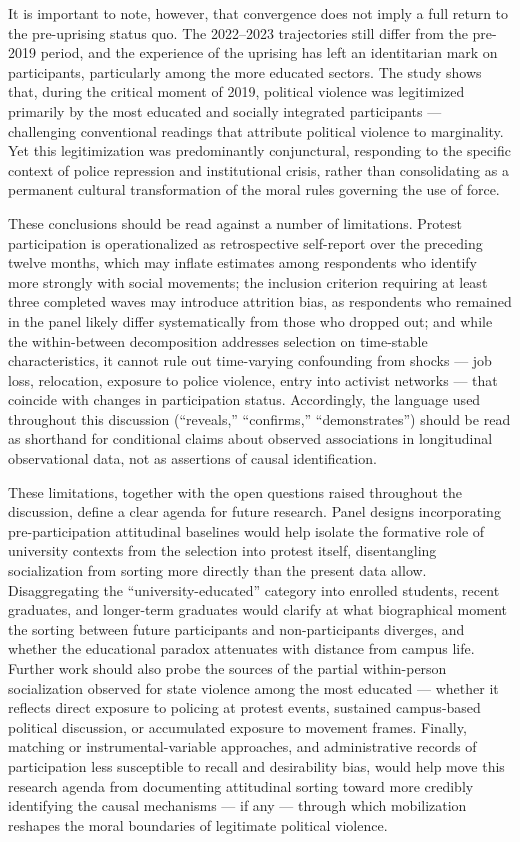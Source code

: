 \documentclass[
  13pt,
]{article}
\begin{document}
It is important to note, however, that convergence does not imply a full
return to the pre-uprising status quo. The 2022--2023 trajectories still
differ from the pre-2019 period, and the experience of the uprising has
left an identitarian mark on participants, particularly among the more
educated sectors. The study shows that, during the critical moment of
2019, political violence was legitimized primarily by the most educated
and socially integrated participants --- challenging conventional
readings that attribute political violence to marginality. Yet this
legitimization was predominantly conjunctural, responding to the
specific context of police repression and institutional crisis, rather
than consolidating as a permanent cultural transformation of the moral
rules governing the use of force.

These conclusions should be read against a number of limitations.
Protest participation is operationalized as retrospective self-report
over the preceding twelve months, which may inflate estimates among
respondents who identify more strongly with social movements; the
inclusion criterion requiring at least three completed waves may
introduce attrition bias, as respondents who remained in the panel
likely differ systematically from those who dropped out; and while the
within-between decomposition addresses selection on time-stable
characteristics, it cannot rule out time-varying confounding from shocks
--- job loss, relocation, exposure to police violence, entry into
activist networks --- that coincide with changes in participation
status. Accordingly, the language used throughout this discussion
(``reveals,'' ``confirms,'' ``demonstrates'') should be read as
shorthand for conditional claims about observed associations in
longitudinal observational data, not as assertions of causal
identification.

These limitations, together with the open questions raised throughout
the discussion, define a clear agenda for future research. Panel designs
incorporating pre-participation attitudinal baselines would help isolate
the formative role of university contexts from the selection into
protest itself, disentangling socialization from sorting more directly
than the present data allow. Disaggregating the ``university-educated''
category into enrolled students, recent graduates, and longer-term
graduates would clarify at what biographical moment the sorting between
future participants and non-participants diverges, and whether the
educational paradox attenuates with distance from campus life. Further
work should also probe the sources of the partial within-person
socialization observed for state violence among the most educated ---
whether it reflects direct exposure to policing at protest events,
sustained campus-based political discussion, or accumulated exposure to
movement frames. Finally, matching or instrumental-variable approaches,
and administrative records of participation less susceptible to recall
and desirability bias, would help move this research agenda from
documenting attitudinal sorting toward more credibly identifying the
causal mechanisms --- if any --- through which mobilization reshapes the
moral boundaries of legitimate political violence.
\end{document}
